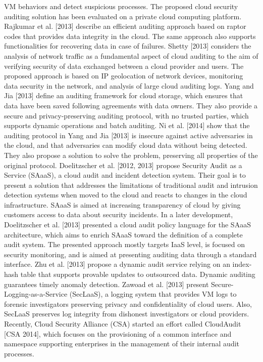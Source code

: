\documentclass[../main.tex]{subfiles}
\begin{document}
VM behaviors and detect suspicious processes. The proposed cloud security auditing
solution has been evaluated on a private cloud computing platform. Rajkumar et al.
[2013] describe an efficient auditing approach based on raptor codes that provides data
integrity in the cloud. The same approach also supports functionalities for recovering
data in case of failures. Shetty [2013] considers the analysis of network traffic as a
fundamental aspect of cloud auditing to the aim of verifying security of data exchanged
between a cloud provider and users. The proposed approach is based on IP geolocation
of network devices, monitoring data security in the network, and analysis of large
cloud auditing logs. Yang and Jia [2013] define an auditing framework for cloud storage,
which ensures that data have been saved following agreements with data owners. They
also provide a secure and privacy-preserving auditing protocol, with no trusted parties,
which supports dynamic operations and batch auditing. Ni et al. [2014] show that the
auditing protocol in Yang and Jia [2013] is insecure against active adversaries in the
cloud, and that adversaries can modify cloud data without being detected. They also
propose a solution to solve the problem, preserving all properties of the original protocol.
Doelitzscher et al. [2012, 2013] propose Security Audit as a Service (SAaaS), a cloud
audit and incident detection system. Their goal is to present a solution that addresses
the limitations of traditional audit and intrusion detection systems when moved to the
cloud and reacts to changes in the cloud infrastructure. SAaaS is aimed at increasing
transparency of cloud by giving customers access to data about security incidents. In
a later development, Doelitzscher et al. [2013] presented a cloud audit policy language
for the SAaaS architecture, which aims to enrich SAaaS toward the definition of a
complete audit system. The presented approach mostly targets IaaS level, is focused
on security monitoring, and is aimed at presenting auditing data through a standard
interface. Zhu et al. [2013] propose a dynamic audit service relying on an index-hash
table that supports provable updates to outsourced data. Dynamic auditing guarantees
timely anomaly detection. Zawoad et al. [2013] present Secure-Logging-as-a-Service
(SecLaaS), a logging system that provides VM logs to forensic investigators preserving
privacy and confidentiality of cloud users. Also, SecLaaS preserves log integrity from
dishonest investigators or cloud providers. Recently, Cloud Security Alliance (CSA)
started an effort called CloudAudit [CSA 2014], which focuses on the provisioning of a
common interface and namespace supporting enterprises in the management of their
internal audit processes.
\end{document}
